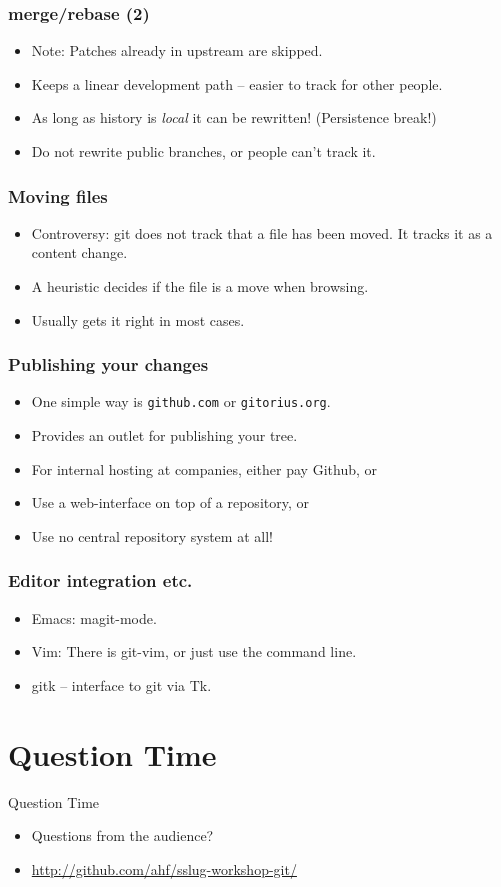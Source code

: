 \documentclass[xcolor=pdftex,dvipsnames]{beamer}
\begin{document}
\begin{frame}
  \frametitle{merge/rebase (2)}
  \begin{itemize}
  \item Note: Patches already in upstream are skipped.
  \item Keeps a linear development path -- easier to track for other
    people.
  \item As long as history is \emph{local} it can be rewritten!
    (Persistence break!)
  \item Do not rewrite public branches, or people can't track it.
  \end{itemize}
\end{frame}

\begin{frame}
  \frametitle{Moving files}
  \begin{itemize}
  \item Controversy: git does not track that a file has been moved. It
    tracks it as a content change.
  \item A heuristic decides if the file is a move when browsing.
  \item Usually gets it right in most cases.
  \end{itemize}
\end{frame}

\begin{frame}
  \frametitle{Publishing your changes}
  \begin{itemize}
  \item One simple way is \texttt{github.com} or \texttt{gitorius.org}.
  \item Provides an outlet for publishing your tree.
  \item For internal hosting at companies, either pay Github, or
  \item Use a web-interface on top of a repository, or
  \item Use no central repository system at all!
  \end{itemize}
\end{frame}

\begin{frame}
  \frametitle{Editor integration etc.}
  \begin{itemize}
  \item Emacs: magit-mode.
  \item Vim: There is git-vim, or just use the command line.
  \item gitk -- interface to git via Tk.
  \end{itemize}
\end{frame}


\section{Question Time}
\begin{frame}{Question Time}
    \begin{itemize}
        \item Questions from the audience?
        \item \url{http://github.com/ahf/sslug-workshop-git/}
    \end{itemize}
\end{frame}
\end{document}
